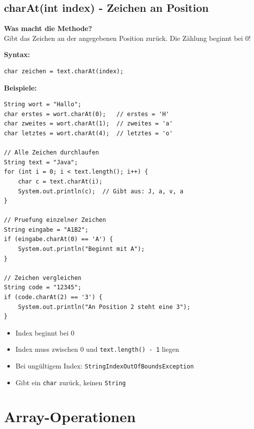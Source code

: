 \newpage


\subsection*{charAt(int index) - Zeichen an Position}

\textbf{Was macht die Methode?}\\
Gibt das Zeichen an der angegebenen Position zurück. Die Zählung beginnt bei 0!

\textbf{Syntax:}
\begin{lstlisting}
char zeichen = text.charAt(index);
\end{lstlisting}

\textbf{Beispiele:}
\begin{lstlisting}
String wort = "Hallo";
char erstes = wort.charAt(0);   // erstes = 'H'
char zweites = wort.charAt(1);  // zweites = 'a'
char letztes = wort.charAt(4);  // letztes = 'o'

// Alle Zeichen durchlaufen
String text = "Java";
for (int i = 0; i < text.length(); i++) {
    char c = text.charAt(i);
    System.out.println(c);  // Gibt aus: J, a, v, a
}

// Pruefung einzelner Zeichen
String eingabe = "A1B2";
if (eingabe.charAt(0) == 'A') {
    System.out.println("Beginnt mit A");
}

// Zeichen vergleichen
String code = "12345";
if (code.charAt(2) == '3') {
    System.out.println("An Position 2 steht eine 3");
}
\end{lstlisting}

\begin{achtung}
	\begin{itemize}
		\item Index beginnt bei 0
		\item Index muss zwischen 0 und \texttt{text.length() - 1} liegen
		\item Bei ungültigem Index: \texttt{StringIndexOutOfBoundsException}
		\item Gibt ein \texttt{char} zurück, keinen \texttt{String}
	\end{itemize}
\end{achtung}

\newpage


\section*{Array-Operationen}

